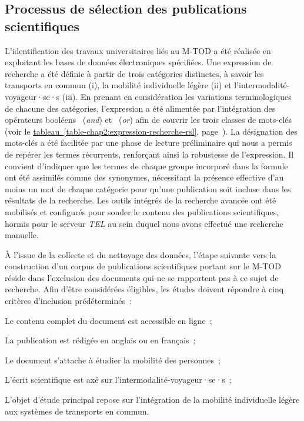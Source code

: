 \begin{refsegment}
\subsection{Processus de sélection des publications scientifiques
    \label{chap2:selection-publications-scientifiques}
    }


L'identification des travaux universitaires liés au \acrshort{M-TOD} a été réalisée en exploitant les bases de données électroniques spécifiées. Une expression de recherche a été définie à partir de trois catégories distinctes, à savoir les transports en commun (i), la mobilité individuelle légère (ii) et l'intermodalité-voyageur·se·s (iii). En prenant en considération les variations terminologiques de chacune des catégories, l'expression a été alimentée par l'intégration des opérateurs booléens ~(\textsl{and}) et ~(\textsl{or}) afin de couvrir les trois classes de mots-clés (voir le \hyperref[table-chap2:expression-recherche-rsl]{tableau~\ref{table-chap2:expression-recherche-rsl}}, page~\pageref{table-chap2:expression-recherche-rsl}). La désignation des mots-clés a été facilitée par une phase de lecture préliminaire qui nous a permis de repérer les termes récurrents, renforçant ainsi la robustesse de l'expression. Il convient d'indiquer que les termes de chaque groupe incorporé dans la formule ont été assimilés comme des synonymes, nécessitant la présence effective d'au moins un mot de chaque catégorie pour qu'une publication soit incluse dans les résultats de la recherche. Les outils intégrés de la recherche avancée ont été mobilisés et configurés pour sonder le contenu des publications scientifiques, hormis pour le serveur \textsl{TEL} au sein duquel nous avons effectué une recherche manuelle.%

À l'issue de la collecte et du nettoyage des données, l'étape suivante vers la construction d'un corpus de publications scientifiques portant sur le \acrshort{M-TOD} réside dans l'exclusion des documents qui ne se rapportent pas à ce sujet de recherche. Afin d'être considérées éligibles, les études doivent répondre à cinq critères d'inclusion prédéterminés~:
    \begin{customitemize}
        \item Le contenu complet du document est accessible en ligne~;
        \item La publication est rédigée en anglais ou en français~;
        \item Le document s'attache à étudier la mobilité des personnes~;
        \item L'écrit scientifique est axé sur l'intermodalité-voyageur·se·s~;
        \item L'objet d'étude principal repose sur l'intégration de la mobilité individuelle légère aux systèmes de transports en commun.
    \end{customitemize}%


\end{refsegment}
